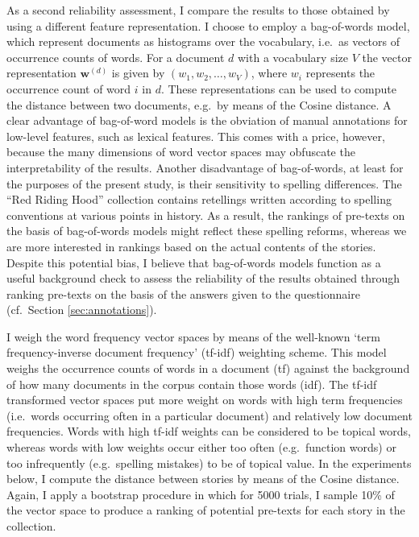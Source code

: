 As a second reliability assessment, I compare the results to those obtained by using a different feature representation. I choose to employ a bag-of-words model, which represent documents as histograms over the vocabulary, i.e.\ as vectors of occurrence counts of words. For a document $d$ with a vocabulary size $V$ the vector representation $\mathbf{w}^{(d)}$ is given by $(w_1, w_2, \ldots, w_V)$, where $w_i$ represents the occurrence count of word $i$ in $d$. These representations can be used to compute the distance between two documents, e.g.\ by means of the Cosine distance. A clear advantage of bag-of-word models is the obviation of manual annotations for low-level features, such as lexical features. This comes with a price, however, because the many dimensions of word vector spaces may obfuscate the interpretability of the results. Another disadvantage of bag-of-words, at least for the purposes of the present study, is their sensitivity to spelling differences. The ``Red Riding Hood'' collection contains retellings written according to spelling conventions at various points in history. As a result, the rankings of pre-texts on the basis of bag-of-words models might reflect these spelling reforms, whereas we are more interested in rankings based on the actual contents of the stories. Despite this potential bias, I believe that bag-of-words models function as a useful background check to assess the reliability of the results obtained through ranking pre-texts on the basis of the answers given to the questionnaire (cf.\ Section \ref{sec:annotations}). 

I weigh the word frequency vector spaces by means of the well-known `term frequency-inverse document frequency' (tf-idf) weighting scheme\autocite{manning:2008}. This model weighs the occurrence counts of words in a document (tf) against the background of how many documents in the corpus contain those words (idf). The tf-idf transformed vector spaces put more weight on words with high term frequencies (i.e.\ words occurring often in a particular document) and relatively low document frequencies. Words with high tf-idf weights can be considered to be topical words, whereas words with low weights occur either too often (e.g.\ function words) or too infrequently (e.g.\ spelling mistakes) to be of topical value. In the experiments below, I compute the distance between stories by means of the Cosine distance. Again, I apply a bootstrap procedure in which for 5000 trials, I sample 10\% of the vector space to produce a ranking of potential pre-texts for each story in the collection.

